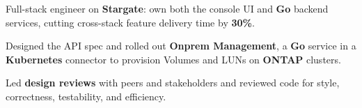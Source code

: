 
\begin{resumeitemize}
    \item Full-stack engineer on \textbf{Stargate}: own both the console UI and \textbf{Go} backend services, cutting cross-stack feature delivery time by \textbf{30\%}.
    \item Designed the API spec and rolled out \textbf{Onprem Management}, a \textbf{Go} service in a \textbf{Kubernetes} connector to provision Volumes and LUNs on \textbf{ONTAP} clusters.
    \item Led \textbf{design reviews} with peers and stakeholders and reviewed code for style, correctness, testability, and efficiency.
\end{resumeitemize}
